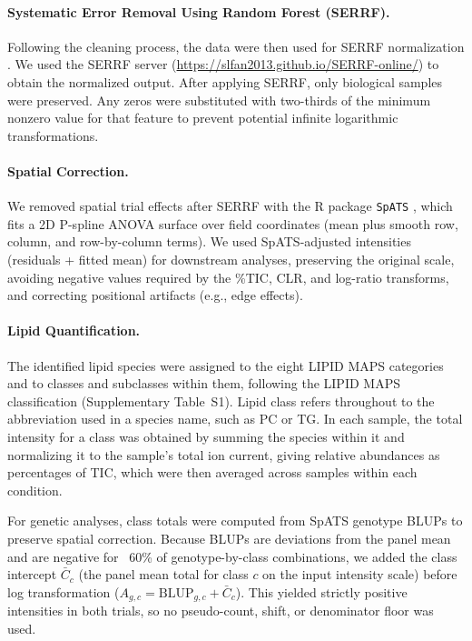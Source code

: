 \documentclass[9pt,twocolumn,twoside]{rilabRxiv}
\begin{document}
\paragraph{Systematic Error Removal Using Random Forest (SERRF).}
Following the cleaning process, the data were then used for SERRF normalization \citep{Fan2019}. We used the SERRF server (\url{https://slfan2013.github.io/SERRF-online/}) to obtain the normalized output. After applying SERRF, only biological samples were preserved. Any zeros were substituted with two-thirds of the minimum nonzero value for that feature to prevent potential infinite logarithmic transformations.

\paragraph{Spatial Correction.}
We removed spatial trial effects after SERRF with the R package \texttt{SpATS} \citep{RodriguezAlvarez2018}, which fits a 2D P-spline ANOVA surface over field coordinates (mean plus smooth row, column, and row-by-column terms). We used SpATS-adjusted intensities (residuals + fitted mean) for downstream analyses, preserving the original scale, avoiding negative values required by the \%TIC, CLR, and log-ratio transforms, and correcting positional artifacts (e.g., edge effects).

\paragraph{Lipid Quantification.}
The identified lipid species were assigned to the eight LIPID MAPS categories and to classes and subclasses within them, following the LIPID MAPS classification \citep{Fahy2009LipidMapsClass} (Supplementary Table~S1). Lipid class refers throughout to the abbreviation used in a species name, such as PC or TG. In each sample, the total intensity for a class was obtained by summing the species within it and normalizing it to the sample's total ion current, giving relative abundances as percentages of TIC, which were then averaged across samples within each condition.

For genetic analyses, class totals were computed from SpATS genotype BLUPs to preserve spatial correction. Because BLUPs are deviations from the panel mean and are negative for ~60\% of genotype-by-class combinations, we added the class intercept $\bar{C}_{c}$ (the panel mean total for class $c$ on the input intensity scale) before log transformation ($A_{g,c}=\mathrm{BLUP}_{g,c}+\bar{C}_{c}$). This yielded strictly positive intensities in both trials, so no pseudo-count, shift, or denominator floor was used.
\end{document}
